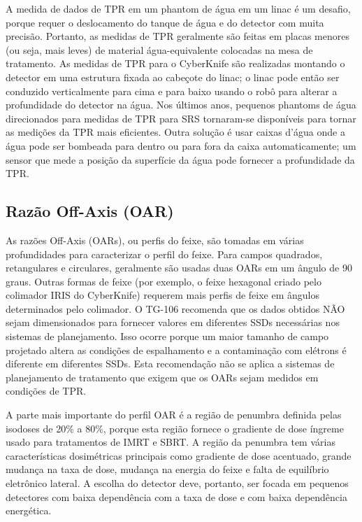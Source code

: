 \documentclass[11pt,a4paper]{article}
\newcounter{exemplo}
\begin{document}
	A medida de dados de TPR em um phantom de água em um linac é um desafio, porque requer o deslocamento do tanque de água e do detector com muita precisão. Portanto, as medidas de TPR geralmente são feitas em placas menores (ou seja, mais leves) de material água-equivalente colocadas na mesa de tratamento. As medidas de TPR para o CyberKnife são realizadas montando o detector em uma estrutura fixada ao cabeçote do linac; o linac pode então ser conduzido verticalmente para cima e para baixo usando o robô para alterar a profundidade do detector na água. Nos últimos anos, pequenos phantoms de água direcionados para medidas de TPR para SRS tornaram-se disponíveis para tornar as medições da TPR mais eficientes. Outra solução é usar caixas d'água onde a água pode ser bombeada para dentro ou para fora da caixa automaticamente; um sensor que mede a posição da superfície da água pode fornecer a profundidade da TPR.

\subsection{Razão Off-Axis (OAR)}

	As razões Off-Axis (OARs), ou perfis do feixe, são tomadas em várias profundidades para caracterizar o perfil do feixe. Para campos quadrados, retangulares e circulares, geralmente são usadas duas OARs em um ângulo de 90 graus. Outras formas de feixe (por exemplo, o feixe hexagonal criado pelo colimador IRIS do CyberKnife) requerem mais perfis de feixe em ângulos determinados pelo colimador. O TG-106 recomenda que os dados obtidos NÃO sejam dimensionados para fornecer valores em diferentes SSDs necessárias nos sistemas de planejamento. Isso ocorre porque um maior tamanho de campo projetado altera as condições de espalhamento e a contaminação com elétrons é diferente em diferentes SSDs. Esta recomendação não se aplica a sistemas de planejamento de tratamento que exigem que os OARs sejam medidos em condições de TPR.

	A parte mais importante do perfil OAR é a região de penumbra definida pelas isodoses de 20\% a 80\%, porque esta região fornece o gradiente de dose íngreme usado para tratamentos de IMRT e SBRT. A região da penumbra tem várias características dosimétricas principais como gradiente de dose acentuado, grande mudança na taxa de dose, mudança na energia do feixe e falta de equilíbrio eletrônico lateral. A escolha do detector deve, portanto, ser focada em pequenos detectores com baixa dependência com a taxa de dose e com baixa dependência energética.
\end{document}
